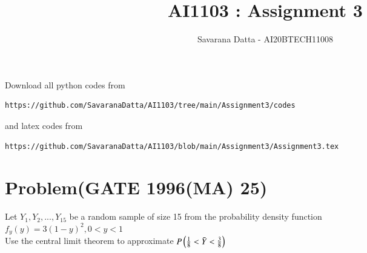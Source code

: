 \documentclass[journal,12pt,twocolumn]{IEEEtran}
\begin{document}
     \def\rightbox#1{\makebox[0in][r]{#1}}
     \def\centbox#1{\makebox[0in]{#1}}
     \def\topbox#1{\raisebox{-\baselineskip}[0in][0in]{#1}}
     \def\midbox#1{\raisebox{-0.5\baselineskip}[0in][0in]{#1}}
\vspace{3cm}
\title{AI1103 : Assignment 3}
\author{Savarana Datta - AI20BTECH11008}
\maketitle
\newpage
\bigskip
\renewcommand{\thefigure}{\theenumi}
\renewcommand{\thetable}{\theenumi}
Download all python codes from 
\begin{lstlisting}
https://github.com/SavaranaDatta/AI1103/tree/main/Assignment3/codes
\end{lstlisting}
%
and latex codes from 
%
\begin{lstlisting}
https://github.com/SavaranaDatta/AI1103/blob/main/Assignment3/Assignment3.tex
\end{lstlisting}


\section*{Problem(GATE 1996(MA) 25)}
Let $Y_{1},Y_{2},...,Y_{15}$ be a random sample of size 15 from the probability density function \\
$f_{y}(y)=3(1-y)^{2} , 0<y<1$\\
Use the central limit theorem to approximate $P\left(\frac{1}{8}<\Bar{Y}<\frac{3}{8}\right)$
\end{document}
